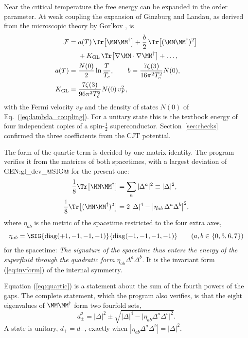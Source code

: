 Near the critical temperature the free energy can be expanded in the order parameter. At weak
coupling the expansion of Ginzburg and Landau, as derived from the microscopic theory by Gor'kov
\cite{Gorkov1959}, is
\begin{align}
\mathcal F={}&a(T)\,\Tr\big[\MM\MM^\dagger\big]+\frac b2\,\Tr\big[(\MM\MM^\dagger)^2\big]\nonumber\\
&+K_{\rm GL}\,\Tr\big[\nabla\MM\cdot\nabla\MM^\dagger\big]+\dots,\nonumber\\
a(T)={}&\frac{N(0)}2\ln\frac{T}{T_c},\qquad b=\frac{7\zeta(3)}{16\pi^2T_c^2}N(0),\nonumber\\
K_{\rm GL}={}&\frac{7\zeta(3)}{96\pi^2T_c^2}N(0)\,v_F^2,
\label{eq:GL}
\end{align}
with the Fermi velocity $v_F$ and the density of states $N(0)$ of Eq.~(\ref{eq:lambda_coupling}). For
a unitary state this is the textbook energy of four independent copies of a spin-$\tfrac12$
superconductor. Section~\ref{sec:checks} confirmed the three coefficients from the CJT potential.

The form of the quartic term is decided by one matrix identity. The program verifies it from the
matrices of both spacetimes, with a largest deviation of {{GEN:gl_dev_@SIG@}} for the present one:
\begin{align}
\frac18\Tr\big[\MM\MM^\dagger\big]&=\sum_a|\Delta^a|^2\equiv|\Delta|^2,\nonumber\\
\frac18\Tr\big[(\MM\MM^\dagger)^2\big]&=2\,|\Delta|^4-\big|\eta_{ab}\,\Delta^a\Delta^b\big|^2 ,
\label{eq:quartic}
\end{align}
where $\eta_{ab}$ is the metric of the spacetime restricted to the four extra axes,
\begin{equation}
\eta_{ab}=\SIG{\mathrm{diag}(+1,-1,-1,-1)}{\mathrm{diag}(-1,-1,-1,-1)}\qquad(a,b\in\{0,5,6,7\})
\label{eq:etaab}
\end{equation}
for the  spacetime:  \emph{The
signature of the spacetime thus enters the energy of the superfluid through the quadratic form
$\eta_{ab}\Delta^a\Delta^b$.} It is the invariant form (\ref{eq:invform}) of the internal symmetry.

Equation (\ref{eq:quartic}) is a statement about the sum of the fourth powers of the gaps. The
complete statement, which the program also verifies, is that the eight eigenvalues of
$\MM\MM^\dagger$ form two fourfold sets,
\begin{equation}
d_\pm^2=|\Delta|^2\pm\sqrt{|\Delta|^4-\big|\eta_{ab}\Delta^a\Delta^b\big|^2}.
\label{eq:twogaps}
\end{equation}
A state is unitary, $d_+=d_-$, exactly when $|\eta_{ab}\Delta^a\Delta^b|=|\Delta|^2$.

